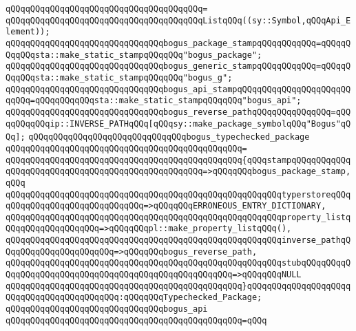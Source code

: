 \verb|qQQqqQQqqQQqqQQqqQQqqQQqqQQqqQQqqQQqqQQq=|\newline
\verb|qQQqqQQqqQQqqQQqqQQqqQQqqQQqqQQqqQQqqQQqListqQQq((sy::Symbol,qQQqApi_Element));|\newline
\newline
\verb|qQQqqQQqqQQqqQQqqQQqqQQqqQQqqQQqbogus_package_stampqQQqqQQqqQQq=qQQqqQQqqQQqsta::make_static_stampqQQqqQQq"bogus_package";|\newline
\verb|qQQqqQQqqQQqqQQqqQQqqQQqqQQqqQQqbogus_generic_stampqQQqqQQqqQQq=qQQqqQQqqQQqsta::make_static_stampqQQqqQQq"bogus_g";|\newline
\verb|qQQqqQQqqQQqqQQqqQQqqQQqqQQqqQQqbogus_api_stampqQQqqQQqqQQqqQQqqQQqqQQqqQQq=qQQqqQQqqQQqsta::make_static_stampqQQqqQQq"bogus_api";|\newline
\verb|qQQqqQQqqQQqqQQqqQQqqQQqqQQqqQQqbogus_reverse_pathqQQqqQQqqQQqqQQq=qQQqqQQqqQQqip::INVERSE_PATHqQQq[qQQqsy::make_package_symbolqQQq"Bogus"qQQq];|\newline
\newline
\verb|qQQqqQQqqQQqqQQqqQQqqQQqqQQqqQQqbogus_typechecked_package|\newline
\verb|qQQqqQQqqQQqqQQqqQQqqQQqqQQqqQQqqQQqqQQqqQQqqQQq=|\newline
\verb|qQQqqQQqqQQqqQQqqQQqqQQqqQQqqQQqqQQqqQQqqQQqqQQq{qQQqstampqQQqqQQqqQQqqQQqqQQqqQQqqQQqqQQqqQQqqQQqqQQqqQQqqQQq=>qQQqqQQqbogus_package_stamp,qQQq|\newline
\verb|qQQqqQQqqQQqqQQqqQQqqQQqqQQqqQQqqQQqqQQqqQQqqQQqqQQqqQQqtyperstoreqQQqqQQqqQQqqQQqqQQqqQQqqQQqqQQq=>qQQqqQQqERRONEOUS_ENTRY_DICTIONARY,|\newline
\verb|qQQqqQQqqQQqqQQqqQQqqQQqqQQqqQQqqQQqqQQqqQQqqQQqqQQqqQQqproperty_listqQQqqQQqqQQqqQQqqQQq=>qQQqqQQqpl::make_property_listqQQq(),|\newline
\verb|qQQqqQQqqQQqqQQqqQQqqQQqqQQqqQQqqQQqqQQqqQQqqQQqqQQqqQQqinverse_pathqQQqqQQqqQQqqQQqqQQqqQQq=>qQQqqQQqbogus_reverse_path,|\newline
\verb|qQQqqQQqqQQqqQQqqQQqqQQqqQQqqQQqqQQqqQQqqQQqqQQqqQQqqQQqstubqQQqqQQqqQQqqQQqqQQqqQQqqQQqqQQqqQQqqQQqqQQqqQQqqQQqqQQq=>qQQqqQQqNULL|\newline
\verb|qQQqqQQqqQQqqQQqqQQqqQQqqQQqqQQqqQQqqQQqqQQqqQQq}qQQqqQQqqQQqqQQqqQQqqQQqqQQqqQQqqQQqqQQqqQQq:qQQqqQQqTypechecked_Package;|\newline
\newline
\verb|qQQqqQQqqQQqqQQqqQQqqQQqqQQqqQQqbogus_api|\newline
\verb|qQQqqQQqqQQqqQQqqQQqqQQqqQQqqQQqqQQqqQQqqQQqqQQq=qQQq|\newline
